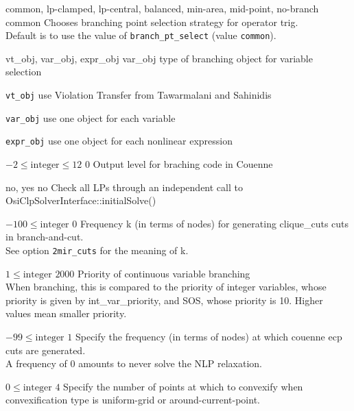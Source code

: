 %
{\ttfamily common, lp-clamped, lp-central, balanced, min-area, mid-point, no-branch}%
{common}%
{Chooses branching point selection strategy for operator trig.\\
Default is to use the value of \texttt{branch\_pt\_select} (value \texttt{common}).}%
{}

%
{\ttfamily vt\_obj, var\_obj, expr\_obj}%
{var\_obj}%
{type of branching object for variable selection}%
{\begin{list}{}{
\setlength{\parsep}{0em}
\setlength{\leftmargin}{5ex}
\setlength{\labelwidth}{2ex}
\setlength{\itemindent}{0ex}
\setlength{\topsep}{0pt}}
\item[\texttt{vt\_obj}] use Violation Transfer from Tawarmalani and Sahinidis
\item[\texttt{var\_obj}] use one object for each variable
\item[\texttt{expr\_obj}] use one object for each nonlinear expression
\end{list}
}

%
{$-2\leq\textrm{integer}\leq12$}%
{$0$}%
{Output level for braching code in Couenne}%
{}

%
{\ttfamily no, yes}%
{no}%
{Check all LPs through an independent call to OsiClpSolverInterface::initialSolve()}%
{}

%
{$-100\leq\textrm{integer}$}%
{$0$}%
{Frequency k (in terms of nodes) for generating clique\_cuts cuts in branch-and-cut.\\
See option \texttt{2mir\_cuts} for the meaning of k.}%
{}

%
{$1\leq\textrm{integer}$}%
{$2000$}%
{Priority of continuous variable branching\\
When branching, this is compared to the priority of integer variables, whose priority is given by int\_var\_priority, and SOS, whose priority is 10. Higher values mean smaller priority.}%
{}

%
{$-99\leq\textrm{integer}$}%
{$1$}%
{Specify the frequency (in terms of nodes) at which couenne ecp cuts are generated.\\
A frequency of 0 amounts to never solve the NLP relaxation.}%
{}

%
{$0\leq\textrm{integer}$}%
{$4$}%
{Specify the number of points at which to convexify when convexification type is uniform-grid or around-current-point.}%
{}

